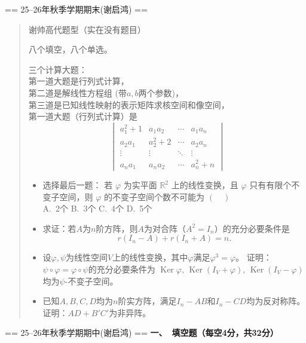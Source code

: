 == 25--26年秋季学期期末(谢启鸿) ==
\begin{quotation}
谢帅高代题型（实在没有题目）

八个填空，八个单选。

三个计算大题：\\
第一道大题是行列式计算，\\
第二道是解线性方程组 (带$a,b$两个参数)，\\
第三道是已知线性映射的表示矩阵求核空间和像空间，\\
第一道大题（行列式计算）是
$$\begin{vmatrix}
a_1^2 + 1 & a_1 a_2 & \cdots & a_1 a_n \\
a_2 a_1 & a_2^2 + 2 & \cdots & a_2 a_n \\
\vdots & \vdots & \ddots & \vdots \\
a_n a_1 & a_n a_2 & \cdots & a_n^2 + n
\end{vmatrix}$$
\begin{itemize}
    \item 选择最后一题：
    若 $\varphi$ 为实平面 $\mathbb{R}^2$ 上的线性变换，且 $\varphi$ 只有有限个不变子空间，则 $\varphi$ 的不变子空间个数不可能为 $(\quad)$ \\
    A.~2个 \qquad B.~3个 \qquad C.~4个 \qquad D.~5个
    \item[六.] 求证：若$A$为$n$阶方阵，则$A$为对合阵（$A^2=I_n$）的充分必要条件是
    \[r(I_n-A)+r(I_n+A)=n.\]
    \item[七.] 设$\varphi,\psi$为线性空间$V$上的线性变换，其中$\varphi$满足$\varphi^3=\varphi$。
    证明：$\psi\circ\varphi=\varphi\circ\psi$的充分必要条件为
    $\operatorname{Ker}\varphi,\,\operatorname{Ker}(I_V+\varphi),\,\operatorname{Ker}(I_V-\varphi)$均为$\psi$-不变子空间。
    \item[八.] 已知$A,B,C,D$均为$n$阶实方阵，满足$I_n-AB$和$I_n-CD$均为反对称阵。证明：$AD+B'C'$为非异阵。
\end{itemize}
\end{quotation}

== 25--26年秋季学期期中(谢启鸿) ==
\textbf{一、\ 填空题（每空4分，共32分）}


